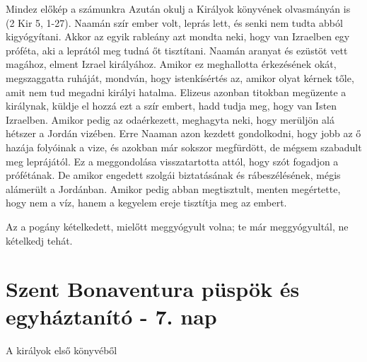 \documentclass[twoside]{article}
\begin{document}
\begin{lectio}{Mindez előkép a számunkra}
Azután okulj a Királyok könyvének olvasmányán is (2 Kir 5, 1-27). Naamán szír ember volt, leprás lett, és senki nem tudta abból kigyógyítani. Akkor az egyik rableány azt mondta neki, hogy van Izraelben egy próféta, aki a leprától meg tudná őt tisztítani. Naamán aranyat és ezüstöt vett magához, elment Izrael királyához. Amikor ez meghallotta érkezésének okát, megszaggatta ruháját, mondván, hogy istenkísértés az, amikor olyat kérnek tőle, amit nem tud megadni királyi hatalma. Elizeus azonban titokban megüzente a királynak, küldje el hozzá ezt a szír embert, hadd tudja meg, hogy van Isten Izraelben. Amikor pedig az odaérkezett, meghagyta neki, hogy merüljön alá hétszer a Jordán vizében. Erre Naaman azon kezdett gondolkodni, hogy jobb az ő hazája folyóinak a vize, és azokban már sokszor megfürdött, de mégsem szabadult meg leprájától. Ez a meggondolása visszatartotta attól, hogy szót fogadjon a prófétának. De amikor engedett szolgái biztatásának és rábeszélésének, mégis alámerült a Jordánban. Amikor pedig abban megtisztult, menten megértette, hogy nem a víz, hanem a kegyelem ereje tisztítja meg az embert.

Az a pogány kételkedett, mielőtt meggyógyult volna; te már meggyógyultál, ne kételkedj tehát.
\end{lectio}



\section*{Szent Bonaventura püspök és egyháztanító - 7. nap}

A királyok első könyvéből
\end{document}
